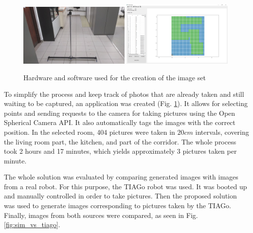 \documentclass{svproc}
\begin{document}
\begin{figure}[!ht]
    \centering
    \includegraphics[width=0.49\textwidth]{img/rig/calosc.jpg}\hfill%
    \includegraphics[width=0.49\textwidth]{img/creator.png}\\
    \caption{Hardware and software used for the creation of the image set}
    \label{fig:rig}
\end{figure}

To simplify the process and keep track of photos that are already taken and still waiting to 
be captured, an application was created (Fig. \ref{fig:rig}).
It allows for selecting points and sending requests to the camera for taking pictures using the
Open Spherical Camera API. It also automatically tags the images with the correct position.
In the selected room, 404 pictures were taken in $20 cm$ intervals, covering the living room part,
the kitchen, and part of the corridor. The whole process took 2 hours and 17 minutes,
which yields approximately 3 pictures taken per minute. 

The whole solution was evaluated by comparing generated images with images from a real robot.
For this purpose, the TIAGo robot was used.
It was booted up and manually controlled in order to take pictures.
Then the proposed solution was used to generate images corresponding to pictures taken by the TIAGo.
Finally, images from both sources were compared, as seen in Fig. \ref{fig:sim_vs_tiago}.
\end{document}
